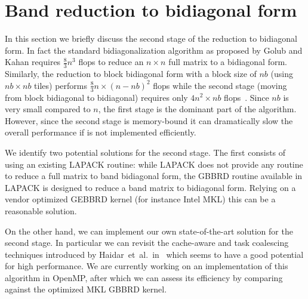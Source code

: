 \section{Band reduction to bidiagonal form}\label{sec:bidiag}
In this section we briefly discuss the second stage of the reduction
to bidiagonal form.
In fact the standard bidiagonalization
algorithm as proposed by Golub and Kahan requires $\frac{8}{3}n^3$
flops to reduce an $n \times n$ full matrix to a bidiagonal form.
Similarly, the reduction to block bidiagonal form with a
block size of $nb$ (using $nb \times nb$ tiles) performs
$\frac{8}{3} n\times (n-nb)^2$ flops while the second stage
(moving from block bidiagonal to bidiagonal)
requires only $4 n^2\times nb$ flops~\cite{ltaief2013high}.
Since $nb$ is very small compared to $n$,
the first stage is the dominant part of the algorithm.
However,
since the second stage is memory-bound it can dramatically slow the
overall performance if is not implemented efficiently.

We identify two potential solutions for the second stage.
The first consists of using an existing LAPACK routine:
while LAPACK does not provide any routine to reduce a
full matrix to band bidiagonal form,
the GBBRD routine available in LAPACK is designed to
reduce a band matrix to bidiagonal form.
Relying on a vendor optimized GEBBRD kernel
(for instance Intel MKL) this can be a reasonable solution.

On the other hand, we can implement our own state-of-the-art
solution for the second stage.
In particular we can revisit the cache-aware
and task coalescing techniques introduced by
Haidar~et~al\@.~in~\cite{haidar2011parallel}
which seems to have a good potential for high performance.
We are currently working on an implementation of this
algorithm in OpenMP,
after which we can assess its efficiency by
comparing against the optimized MKL GBBRD kernel.
